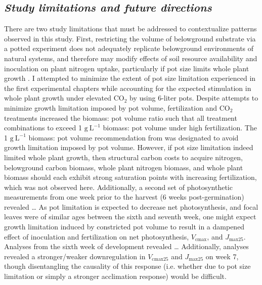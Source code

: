 \subsection{\textit{Study limitations and future directions}}
There are two study limitations that must be addressed to contextualize patterns observed in this study. First, restricting the volume of belowground substrate via a potted experiment does not adequately replicate belowground environments of natural systems, and therefore may modify effects of soil resource availability and inoculation on plant nitrogen uptake, particularly if pot size limits whole plant growth . I attempted to minimize the extent of pot size limitation experienced in the first experimental chapters while accounting for the expected stimulation in whole plant growth under elevated CO$_2$ by using 6-liter pots. Despite attempts to minimize growth limitation imposed by pot volume, fertilization and CO$_2$ treatments increased the biomass: pot volume ratio such that all treatment combinations to exceed 1 $\mathrm{g\ L^{-1}}$ biomass: pot volume under high fertilization. The 1 $\mathrm{g\ L^{-1}}$ biomass: pot volume recommendation from  was designated to avoid growth limitation imposed by pot volume. However, if pot size limitation indeed limited whole plant growth, then structural carbon costs to acquire nitrogen, belowground carbon biomass, whole plant nitrogen biomass, and whole plant biomass should each exhibit strong saturation points with increasing fertilization, which was not observed here. Additionally, a second set of photosynthetic measurements from one week prior to the harvest (6 weeks post-germination) revealed … As pot limitation is expected to decrease net photosynthesis, and focal leaves were of similar ages between the sixth and seventh week, one might expect growth limitation induced by constricted pot volume to result in a dampened effect of inoculation and fertilization on net photosynthesis, $V_\mathrm{cmax}$, and $J_\mathrm{max25}$. Analyses from the sixth week of development revealed … Additionally, analyses revealed a stronger/weaker downregulation in $V_\mathrm{cmax25}$ and $J_\mathrm{max25}$ on week 7, though disentangling the causality of this response (i.e. whether due to pot size limitation or simply a stronger acclimation response) would be difficult.

